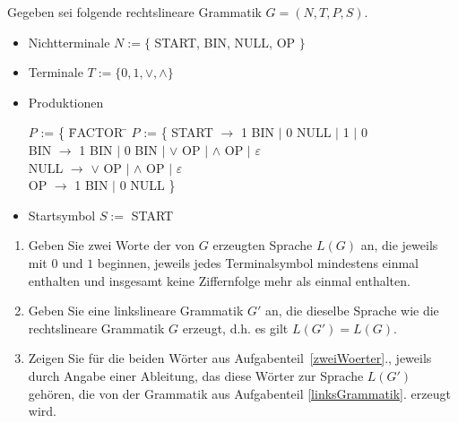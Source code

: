 \documentclass{uebungsblatt}
\begin{document}
\newpage
\begin{aufgabe}
	\medskip
	Gegeben sei folgende rechtslineare Grammatik $G = (N,T,P,S)$.
	\begin{itemize}
		\item
		      Nichtterminale
		      $N := \{$ START, BIN, NULL, OP $\}$
		\item
		      Terminale
		      $T := \{0, 1, \vee, \wedge\}$
		\item
		      Produktionen
		      \begin{tabbing}
			      $P$ := \{ \quad \= FACTOR \quad \= \kill
			      $P$ := \{ \> START  \>$\rightarrow$ 1 BIN $|$ 0 NULL $|$ 1 $|$ 0  \\
			      \> BIN    \>$\rightarrow$ 1 BIN $|$ 0 BIN $|$ $\vee$ OP $|$ $\wedge$ OP $|$ $\varepsilon$ \\
			      \> NULL   \>$\rightarrow$ $\vee$ OP $|$ $\wedge$ OP $|$ $\varepsilon$ \\
			      \> OP     \>$\rightarrow$ 1 BIN $|$ 0 NULL \quad \}
		      \end{tabbing}
		\item
		      Startsymbol $S :=$ START
	\end{itemize}

	\begin{enumerate}
		\item
		      \label{zweiWoerter}
		      Geben Sie zwei Worte der von $G$ erzeugten Sprache $L(G)$ an,
		      die jeweils mit $0$ und $1$ beginnen,
		      jeweils jedes Terminalsymbol mindestens einmal enthalten und
		      insgesamt keine Ziffernfolge mehr als einmal enthalten.\\
		\item
		      \label{linksGrammatik}
		      Geben Sie eine linkslineare Grammatik $G'$ an,
		      die dieselbe Sprache wie die rechtslineare Grammatik $G$
		      erzeugt, d.h. es gilt $L(G') = L(G)$.\\
		\item
		      Zeigen Sie für die beiden Wörter aus Aufgabenteil~\ref{zweiWoerter}., jeweils
		      durch Angabe einer Ableitung, das diese Wörter zur Sprache $L(G')$ gehören, die
		      von der Grammatik aus Aufgabenteil \ref{linksGrammatik}. erzeugt wird.\\

	\end{enumerate}
\end{aufgabe}
\begin{loesung}

\end{loesung}
\end{document}
